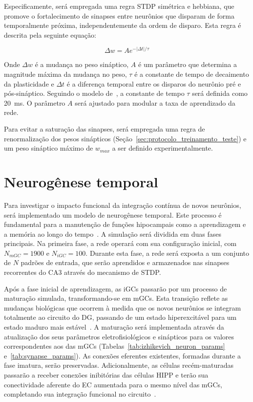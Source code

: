 Especificamente, será empregada uma regra STDP simétrica e hebbiana, que promove o fortalecimento de sinapses entre neurônios que
disparam de forma temporalmente próxima, independentemente da ordem de disparo. Esta regra é descrita pela seguinte equação: 

\begin{equation}
    \label{eq:stdp}
    \Delta w = A e^{-|\Delta t|/\tau}
\end{equation}

Onde $\Delta w$ é a mudança no peso sináptico, $A$ é um parâmetro que determina a magnitude máxima da mudança no peso, $\tau$ é a
constante de tempo de decaimento da plasticidade e $\Delta t$ é a diferença temporal entre os disparos do neurônio pré e
pós-sináptico. Seguindo o modelo de~\cite{kopsickFormation2024}, a constante de tempo $\tau$ será definida como
\SI{20}{\milli\second}. O parâmetro $A$ será ajustado para modular a taxa de aprendizado da rede.

Para evitar a saturação das sinapses, será empregada uma regra de renormalização dos pesos sinápticos
(Seção~\ref{sec:protocolo_treinamento_teste}) e um peso sináptico máximo de $w_{max}$ a ser definido experimentalmente.

\section{Neurogênese temporal}

Para investigar o impacto funcional da integração contínua de novos neurônios, será implementado um modelo de neurogênese
temporal. Este processo é fundamental para a manutenção de funções hipocampais como a aprendizagem e a memória ao longo do
tempo~\cite{aimoneRegulation2014, berdugo-vegaSharpening2023}. A simulação será dividida em duas fases principais. Na primeira
fase, a rede operará com sua configuração inicial, com $N_{mGC} = 1900$ e $N_{iGC} = 100$. Durante esta fase, a rede será exposta
a um conjunto de $N$ padrões de entrada, que serão aprendidos e armazenados nas sinapses recorrentes do CA3 através do mecanismo
de STDP.

Após a fase inicial de aprendizagem, as iGCs passarão por um processo de maturação simulada, transformando-se em mGCs. Esta
transição reflete as mudanças biológicas que ocorrem à medida que os novos neurônios se integram totalmente ao circuito do DG,
passando de um estado hiperexcitável para um estado maduro mais estável~\cite{abbottAdult2020}. A maturação será implementada
através da atualização dos seus parâmetros eletrofisiológicos e sinápticos para os valores correspondentes aos das mGCs
(Tabelas~\ref{tab:izhikevich_neuron_params} e~\ref{tab:synapse_params}). As conexões eferentes existentes, formadas durante a fase
imatura, serão preservadas. Adicionalmente, as células recém-maturadas passarão a receber conexões inibitórias das células HIPP e
terão sua conectividade aferente do EC aumentada para o mesmo nível das mGCs, completando sua integração funcional no
circuito~\cite{lunaAdultborn2019}.

